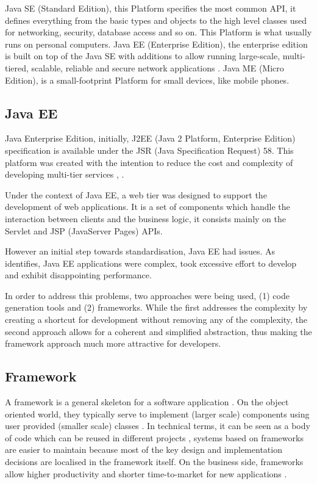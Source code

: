 Java SE (Standard Edition), this Platform specifies the most common API, it defines everything from the basic types and objects to the high level classes used for networking, security, database access and so on. This Platform is what usually runs on personal computers.
Java EE (Enterprise Edition), the enterprise edition is built on top of the Java SE with additions to allow running large-scale, multi-tiered, scalable, reliable and secure network applications \cite{firstcup}.
Java ME (Micro Edition), is a small-footprint Platform for small devices, like mobile phones.

\subsection{Java EE}

Java Enterprise Edition, initially, J2EE (Java 2 Platform, Enterprise Edition) specification is available under the JSR (Java Specification Request) 58. This platform was created with the intention to reduce the cost and complexity of developing multi-tier services \cite{jsr58}, \cite{javaEEDeveloperGuide}. 

Under the context of Java EE, a web tier was designed to support the development of web applications. It is a set of components which handle the interaction between clients and the business logic, it consists mainly on the Servlet and JSP (JavaServer Pages) APIs\cite{jsrServletAPI}.

However an initial step towards standardisation, Java EE had issues. As \cite{javaDevelopmentWithSpring} identifies, Java EE applications were complex, took excessive effort to develop and exhibit disappointing performance.

In order to address this problems, two approaches were being used, (1) code generation tools and (2) frameworks. While the first addresses the complexity by creating a shortcut for development without removing any of the complexity, the second approach allows for a coherent and simplified abstraction, thus making the framework approach much more attractive for developers.

\subsection{Framework}

A framework is a general skeleton for a software application \cite{smaltalk}. On the object oriented world, they typically serve to implement (larger scale) components using user provided (smaller scale) classes \cite{thesis}. In technical terms, it can be seen as a body of code which can be reused in different projects \cite{smaltalk}, systems based on frameworks are easier to maintain because most of the key design and implementation decisions are localised in the framework itself.  On the business side, frameworks allow higher productivity and shorter time-to-market for new applications \cite{thesis}.

